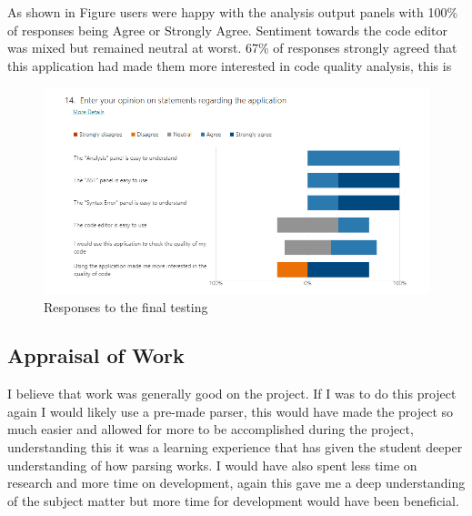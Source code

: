 As shown in Figure  users were happy with the analysis output panels with 100\% of responses being Agree or Strongly Agree. 
Sentiment towards the code editor was mixed but remained neutral at worst. 67\% of responses strongly agreed that this application had made them more interested in 
code quality analysis, this is 
\begin{figure}[h]
    \includegraphics[width=.5\textwidth]{images/finaltestingopinion.png}
    \caption{Responses to the final testing}
    \label{fig:responses2}
\end{figure}

\subsection{Appraisal of Work}
I believe that work was generally good on the project. If I was to do this project again I would likely use 
a pre-made parser, this would have made the project so much easier and allowed for more to be accomplished during the project, understanding this 
it was a learning experience that has given the student deeper understanding of how parsing works.
\newline
I would have also spent less time on research and more time on development, again this gave me a deep understanding of the subject matter but more time for 
development would have been beneficial.
